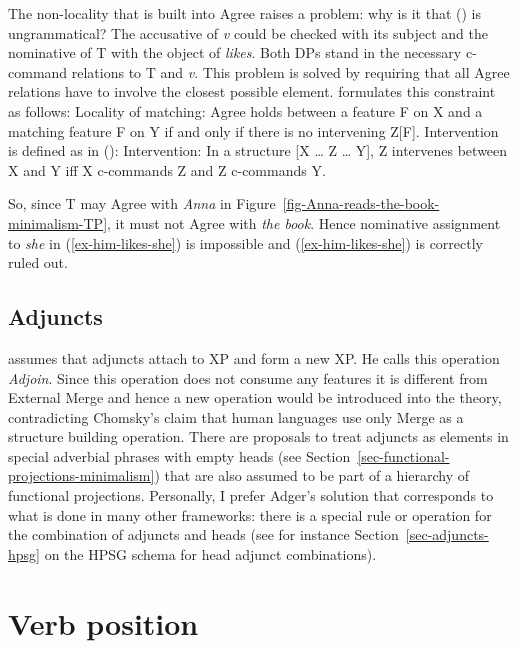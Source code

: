 The non-locality that is built into Agree raises a problem: why is it that () is
ungrammatical?
\z
The accusative of \textit{v} could be checked with its subject and the nominative of T with the
object of \emph{likes}. Both DPs stand in the necessary c-command relations to T and \textit{v}. This
problem is solved by requiring that all Agree relations have to involve the closest possible
element. \citet[]{Adger2003a} formulates this constraint as follows:
\ea
\label{principle-locality-of-matching}
Locality of matching: Agree holds between a feature F on X and a matching feature F on Y if and only
if there is no intervening Z[F].
\z
Intervention is defined as in ():
\ea
\label{def-intervention}
Intervention: In a structure [X \ldots{} Z \ldots{} Y], Z intervenes between X and Y iff X
c-commands Z and Z c-commands Y.
\z

So, since T may Agree with \emph{Anna} in Figure~\ref{fig-Anna-reads-the-book-minimalism-TP}, it must not Agree with \emph{the book}. Hence
nominative assignment to \emph{she} in (\ref{ex-him-likes-she}) is impossible and (\ref{ex-him-likes-she}) is correctly ruled out.

\subsection{Adjuncts}

\addlines
\citet[Section~4.2.3]{Adger2003a} assumes that adjuncts attach to XP and form a new XP. He calls
this operation \emph{Adjoin}. Since this operation does not consume any features it is different from
External Merge and hence a new operation would be introduced into the theory, contradicting
Chomsky's claim that human languages use only Merge as a structure building
operation. There are
proposals to treat adjuncts as elements in special adverbial phrases with empty heads (see
Section~\ref{sec-functional-projections-minimalism}) that are also assumed to be part of a hierarchy of functional
projections. Personally, I prefer Adger's solution that corresponds to what is done in many other
frameworks: there is a special rule or operation for the combination of adjuncts and heads (see for instance
Section~\ref{sec-adjuncts-hpsg} on the HPSG schema for head adjunct combinations).


\section{Verb position}
\label{sec-verb-position-MP}

